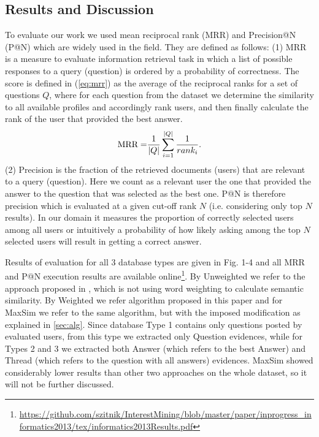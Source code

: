 \documentclass[conference]{IEEEtran}
\begin{document}
\subsection{Results and Discussion}
To evaluate our work we used mean reciprocal rank (MRR) and Precision@N (P@N) which are widely used in the field. They are defined as follows: (1) MRR is a measure to evaluate information retrieval task in which a list of possible responses to a query (question) is ordered by a probability of correctness. The score is defined in (\ref{eq:mrr}) as the average of the reciprocal ranks for a set of questions $Q$, where for each question from the dataset we determine the similarity to all available profiles and accordingly rank users, and then finally calculate the rank of the user that provided the best answer.
\begin{equation}
	\label{eq:mrr}
	{\rm MRR = }\frac{1}{|Q|}\sum_{i=1}^{|Q|}\frac{1}{rank_i}.
\end{equation}
(2) Precision is the fraction of the retrieved documents (users) that are relevant to a query (question). Here we count as a relevant user the one that provided the answer to the question that was selected as the best one. P@N is therefore precision which is evaluated at a given cut-off rank $N$ (i.e. considering only top $N$ results). In our domain it measures the proportion of correctly selected users among all users or intuitively a probability of how likely asking among the top $N$ selected users will result in getting a correct answer.

Results of evaluation for all 3 database types are given in Fig. 1-4 and all MRR and P@N execution results are available online\footnote{\url{https://github.com/szitnik/InterestMining/blob/master/paper/inprogress_informatics2013/tex/informatics2013Results.pdf}}. By Unweighted we refer to the approach proposed in \cite{bib:1}, which is not using word weighting to calculate semantic similarity. By Weighted we refer algorithm proposed in this paper and for MaxSim we refer to the same algorithm, but with the imposed modification as explained in \ref{sec:alg}.  
Since database Type 1 contains only questions posted by evaluated users, from this type we extracted only Question evidences, while for Types 2 and 3 we extracted both Answer (which refers to the best Answer) and Thread (which refers to the question with all answers) evidences. MaxSim showed considerably lower results than other two approaches on the whole dataset, so it will not be further discussed.
\end{document}
